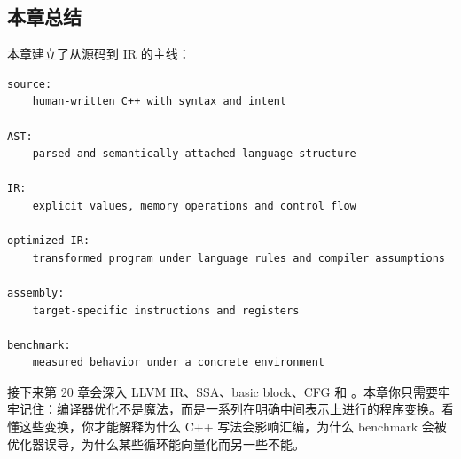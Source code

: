 \subsection{本章总结}

本章建立了从源码到 IR 的主线：

\begin{lstlisting}
source:
    human-written C++ with syntax and intent

AST:
    parsed and semantically attached language structure

IR:
    explicit values, memory operations and control flow

optimized IR:
    transformed program under language rules and compiler assumptions

assembly:
    target-specific instructions and registers

benchmark:
    measured behavior under a concrete environment
\end{lstlisting}

接下来第 20 章会深入 LLVM IR、SSA、basic block、CFG 和 。本章你只需要牢牢记住：编译器优化不是魔法，而是一系列在明确中间表示上进行的程序变换。看懂这些变换，你才能解释为什么 C++ 写法会影响汇编，为什么 benchmark 会被优化器误导，为什么某些循环能向量化而另一些不能。
